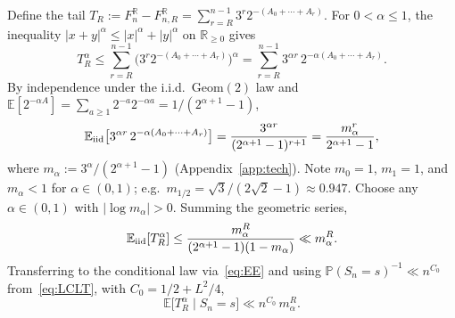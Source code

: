 \documentclass[11pt,a4paper]{amsart}
\theoremstyle{plain}
\theoremstyle{definition}
\newcommand{\R}{\mathbb{R}}
\newcommand{\E}{\mathbb{E}}
\newcommand{\PP}{\mathbb{P}}
\newcommand{\Geom}{\mathrm{Geom}}
\begin{document}
\iffalse
Define the tail $T_R:=F_n^{\R}-F_{n,R}^{\R}=\sum_{r=R}^{n-1}3^r 2^{-(A_0+\cdots+A_r)}$.
For $0<\alpha\le 1$, the inequality $|x+y|^\alpha\le|x|^\alpha+|y|^\alpha$ on
$\R_{\ge 0}$ gives
$$
T_R^\alpha\le\sum_{r=R}^{n-1}\bigl(3^r 2^{-(A_0+\cdots+A_r)}\bigr)^\alpha
=\sum_{r=R}^{n-1}3^{\alpha r}\,2^{-\alpha(A_0+\cdots+A_r)}.
$$
By independence under the i.i.d.\ $\Geom(2)$ law and
$\E[2^{-\alpha A}]=\sum_{a\ge 1}2^{-a}2^{-\alpha a}=1/(2^{\alpha+1}-1)$,
$$
\E_{\rm iid}\bigl[3^{\alpha r}\,2^{-\alpha(A_0+\cdots+A_r)}\bigr]
=\frac{3^{\alpha r}}{(2^{\alpha+1}-1)^{r+1}}=\frac{m_\alpha^r}{2^{\alpha+1}-1},
$$
where $m_\alpha:=3^\alpha/(2^{\alpha+1}-1)$ (Appendix~\ref{app:tech}).
Note $m_0=1$, $m_1=1$, and $m_\alpha<1$ for $\alpha\in(0,1)$;
e.g.\ $m_{1/2}=\sqrt 3/(2\sqrt 2-1)\approx 0.947$.
Choose any $\alpha\in(0,1)$ with $|\log m_\alpha|>0$.
Summing the geometric series,
\begin{equation}\label{eq:tailmoment}
\E_{\rm iid}[T_R^\alpha]\le\frac{m_\alpha^R}{(2^{\alpha+1}-1)(1-m_\alpha)}\ll m_\alpha^R.
\end{equation}
Transferring to the conditional law via~\eqref{eq:EE} and using
$\PP(S_n=s)^{-1}\ll n^{C_0}$ from~\eqref{eq:LCLT}, with $C_0=1/2+L^2/4$,
\begin{equation}\label{eq:tailmoment-cond}
\E\bigl[T_R^\alpha\mid S_n=s\bigr]\ll n^{C_0}\,m_\alpha^R.
\end{equation}
\end{document}
